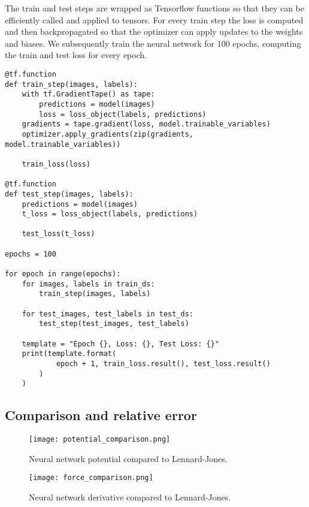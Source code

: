 The train and test steps are wrapped as Tensorflow functions
so that they can be efficiently called and applied to tensors.
For every train step the loss is computed and then backpropagated
so that the optimizer can apply updates to the weights and biases.
We subsequently train the neural network for 100 epochs, computing
the train and test loss for every epoch.

\begin{verbatim}
@tf.function
def train_step(images, labels):
    with tf.GradientTape() as tape:
        predictions = model(images)
        loss = loss_object(labels, predictions)
    gradients = tape.gradient(loss, model.trainable_variables)
    optimizer.apply_gradients(zip(gradients, model.trainable_variables))

    train_loss(loss)

@tf.function
def test_step(images, labels):
    predictions = model(images)
    t_loss = loss_object(labels, predictions)

    test_loss(t_loss)

epochs = 100

for epoch in range(epochs):
    for images, labels in train_ds:
        train_step(images, labels)

    for test_images, test_labels in test_ds:
        test_step(test_images, test_labels)

    template = "Epoch {}, Loss: {}, Test Loss: {}"
    print(template.format(
            epoch + 1, train_loss.result(), test_loss.result()
        )
    )
\end{verbatim}

\subsection{Comparison and relative error}

\begin{figure}[H]
    \centering
    \texttt{[image: potential\_comparison.png]}
    \caption{Neural network potential compared to Lennard-Jones.}
    \label{fig:potential-comparison}
\end{figure}

\begin{figure}[H]
    \centering
    \texttt{[image: force\_comparison.png]}
    \caption{Neural network derivative compared to Lennard-Jones.}
    \label{fig:force-comparison}
\end{figure}

